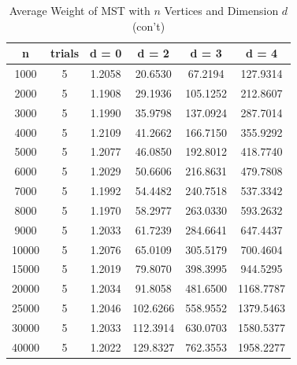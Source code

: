 \documentclass[12pt]{article}
\begin{document}
\begin{table}[h!]
\centering
\caption{Average Weight of MST with $n$ Vertices and Dimension $d$ (con't)}
\begin{tabular} {c | c | c | c | c | c  }
n&trials&d = 0&d = 2&d = 3&d = 4\\ \hline
1000&5&1.2058&20.6530&67.2194&127.9314\\
2000&5&1.1908&29.1936&105.1252&212.8607\\
3000&5&1.1990&35.9798&137.0924&287.7014\\
4000&5&1.2109&41.2662&166.7150&355.9292\\
5000&5&1.2077&46.0850&192.8012&418.7740\\
6000&5&1.2029&50.6606&216.8631&479.7808\\
7000&5&1.1992&54.4482&240.7518&537.3342\\
8000&5&1.1970&58.2977&263.0330&593.2632\\
9000&5&1.2033&61.7239&284.6641&647.4437\\
10000&5&1.2076&65.0109&305.5179&700.4604\\
15000&5&1.2019&79.8070&398.3995&944.5295\\
20000&5&1.2034&91.8058&481.6500&1168.7787\\
25000&5&1.2046&102.6266&558.9552&1379.5463\\
30000&5&1.2033&112.3914&630.0703&1580.5377\\
40000&5&1.2022&129.8327&762.3553&1958.2277\\
\end{tabular}
\label{table:2}
\end{table}

\pagebreak
\end{document}
